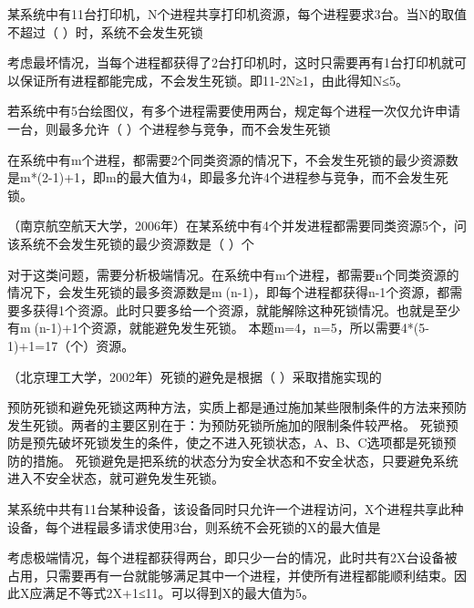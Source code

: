 \question 某系统中有11台打印机，N个进程共享打印机资源，每个进程要求3台。当N的取值不超过（
）时，系统不会发生死锁
\par{}
\begin{solution}考虑最坏情况，当每个进程都获得了2台打印机时，这时只需要再有1台打印机就可以保证所有进程都能完成，不会发生死锁。即11-2N≥1，由此得知N≤5。
\end{solution}
\question 若系统中有5台绘图仪，有多个进程需要使用两台，规定每个进程一次仅允许申请一台，则最多允许（
）个进程参与竞争，而不会发生死锁
\par{}
\begin{solution}在系统中有m个进程，都需要2个同类资源的情况下，不会发生死锁的最少资源数是m*(2-1)+1，即m的最大值为4，即最多允许4个进程参与竞争，而不会发生死锁。
\end{solution}
\question （南京航空航天大学，2006年）在某系统中有4个并发进程都需要同类资源5个，问该系统不会发生死锁的最少资源数是（
）个
\par{}
\begin{solution}对于这类问题，需要分析极端情况。在系统中有m个进程，都需要n个同类资源的情况下，会发生死锁的最多资源数是m(n-1)，即每个进程都获得n-1个资源，都需要多获得1个资源。此时只要多给一个资源，就能解除这种死锁情况。也就是至少有m(n-1)+1个资源，就能避免发生死锁。
本题m=4，n=5，所以需要4*(5-1)+1=17（个）资源。
\end{solution}
\question （北京理工大学，2002年）死锁的避免是根据（ ）采取措施实现的
\par{}
\begin{solution}预防死锁和避免死锁这两种方法，实质上都是通过施加某些限制条件的方法来预防发生死锁。两者的主要区别在于：为预防死锁所施加的限制条件较严格。
死锁预防是预先破坏死锁发生的条件，使之不进入死锁状态，A、B、C选项都是死锁预防的措施。
死锁避免是把系统的状态分为安全状态和不安全状态，只要避免系统进入不安全状态，就可避免发生死锁。
\end{solution}
\question 某系统中共有11台某种设备，该设备同时只允许一个进程访问，X个进程共享此种设备，每个进程最多请求使用3台，则系统不会死锁的X的最大值是
\par{}
\begin{solution}考虑极端情况，每个进程都获得两台，即只少一台的情况，此时共有2X台设备被占用，只需要再有一台就能够满足其中一个进程，并使所有进程都能顺利结束。因此X应满足不等式2X+1≤11。可以得到X的最大值为5。
\end{solution}
